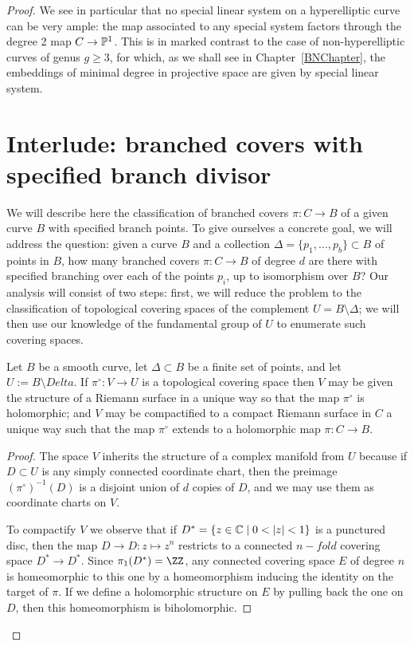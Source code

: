 \begin{proof}
We see in particular that no special linear system on a hyperelliptic curve can be very ample: the map associated to any special system factors through the degree 2 map $C \to \PP^1$. This is in marked contrast to the case of non-hyperelliptic curves of genus $g \geq 3$, for which, as we shall see in Chapter~\ref{BNChapter}, the embeddings of minimal degree in projective space are given by special linear system.

   \section{Interlude: branched covers with specified branch divisor}\label{branched covers}
   
   We will describe here the classification of branched covers $\pi : C \to B$ of a given curve $B$ with specified branch points. To give ourselves a concrete goal, we will address the question: given a curve $B$ and a collection $\Delta = \{p_1,\dots,p_b\} \subset B$ of points in $B$, how many branched covers $\pi : C \to B$ of degree $d$ are there with specified branching over each of the points $p_i$, up to isomorphism over $B$? Our analysis will consist of two steps: first, we will reduce the problem to the classification of topological covering spaces of the complement $U = B \setminus \Delta$; we will then use our knowledge of the fundamental group of $U$ to enumerate such covering spaces.
   
\begin{theorem}
 Let $B$ be a smooth curve, let $\Delta\subset B$ be a finite set of points, and let $U := B\setminus Delta$.
If $\pi^\circ : V \to U$ is a topological covering space then $V$ may be given the structure of a Riemann surface in a unique way so that the map $\pi^\circ$ is holomorphic; and $V$ may be compactified to a compact Riemann surface in $C$ a unique way such that the map $\pi^\circ$ extends to a holomorphic map $\pi : C \to B$.
\end{theorem} 

\begin{proof}
The space $V$ inherits the structure of a complex manifold from $U$ because if $D \subset U$ is any simply connected coordinate chart, then the preimage $({\pi^\circ})^{-1}(D)$ is a disjoint union of $d$ copies of $D$, and we may use them as coordinate charts on $V$. 
   
To compactify $V$ we observe that if $D^* = \{ z \in \CC \mid 0 < |z| < 1 \}$ is a punctured disc, then
the map $D\to D: z \mapsto z^n$ restricts to a connected $n-fold$ covering space $D^*\to D^*$. 
Since $\pi_1(D^*) = \ZZ$, any connected covering space $E$ of degree $n$ is homeomorphic to this one
by a homeomorphism inducing the identity on the target of $\pi$.
If we  define a holomorphic structure on $E$ by pulling back the one on $D$, then
this homeomorphism is biholomorphic.


\end{proof}
\end{proof}
